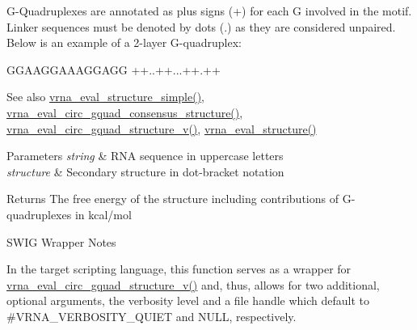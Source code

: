 G-\/\+Quadruplexes are annotated as plus signs (\textquotesingle{}+\textquotesingle{}) for each G involved in the motif. Linker sequences must be denoted by dots (\textquotesingle{}.\textquotesingle{}) as they are considered unpaired. Below is an example of a 2-\/layer G-\/quadruplex\+: 
\begin{DoxyCode}
GGAAGGAAAGGAGG
++..++...++.++
\end{DoxyCode}


\begin{DoxySeeAlso}{See also}
\hyperlink{group__eval_ga7e5273464b775d4130245681312c1369}{vrna\+\_\+eval\+\_\+structure\+\_\+simple()}, \hyperlink{group__eval_gac673ebb9ae2a29f54d201e2ac5b85540}{vrna\+\_\+eval\+\_\+circ\+\_\+gquad\+\_\+consensus\+\_\+structure()}, \hyperlink{group__eval_gab96a6c59923ff06c35f8c2fd2c239727}{vrna\+\_\+eval\+\_\+circ\+\_\+gquad\+\_\+structure\+\_\+v()}, \hyperlink{group__eval_ga58f199f1438d794a265f3b27fc8ea631}{vrna\+\_\+eval\+\_\+structure()}
\end{DoxySeeAlso}

\begin{DoxyParams}{Parameters}
{\em string} & R\+NA sequence in uppercase letters \\
\hline
{\em structure} & Secondary structure in dot-\/bracket notation \\
\hline
\end{DoxyParams}
\begin{DoxyReturn}{Returns}
The free energy of the structure including contributions of G-\/quadruplexes in kcal/mol
\end{DoxyReturn}
\begin{DoxyRefDesc}{S\+W\+I\+G Wrapper Notes}
\item[\hyperlink{wrappers__wrappers000038}{S\+W\+I\+G Wrapper Notes}]In the target scripting language, this function serves as a wrapper for \hyperlink{group__eval_gab96a6c59923ff06c35f8c2fd2c239727}{vrna\+\_\+eval\+\_\+circ\+\_\+gquad\+\_\+structure\+\_\+v()} and, thus, allows for two additional, optional arguments, the verbosity level and a file handle which default to \#\+V\+R\+N\+A\+\_\+\+V\+E\+R\+B\+O\+S\+I\+T\+Y\+\_\+\+Q\+U\+I\+ET and N\+U\+LL, respectively. \end{DoxyRefDesc}
\mbox{\label{group__eval_gaf928bfd96767e1b8033a95a4cc432e39}} 
